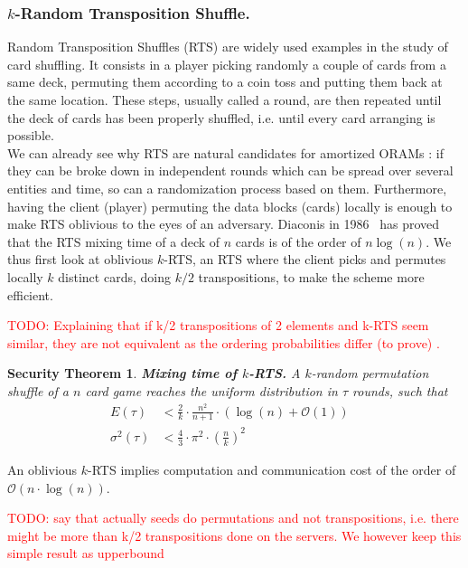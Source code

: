 \documentclass{llncs}
\newtheorem{secthm}{Security Theorem}
\newcommand{\todo}[1]{\textcolor{red}{TODO: #1}}
\begin{document}
\subsubsection{$k$-Random Transposition Shuffle.}
Random Transposition Shuffles (RTS) are widely used examples in the study of card shuffling. It consists in a player picking randomly a couple of cards from a same deck, permuting them according to a coin toss and putting them back at the same location.
These steps, usually called a round, are then repeated until the deck of cards has been properly shuffled, i.e. until every card arranging is possible.\\
We can already see why RTS are natural candidates for amortized ORAMs : if they can be broke down in independent rounds which can be spread over several entities and time, so can a randomization process based on them. Furthermore, having the client (player) permuting the data blocks (cards) locally is enough to make RTS oblivious to the eyes of an adversary.
Diaconis in 1986~\cite{aldous1986shuffling} has proved that the RTS mixing time of a deck of $n$ cards is of the order of $n\log(n)$. We thus first look at oblivious $k$-RTS, an RTS where the client picks and permutes locally $k$ distinct cards, doing $k/2$ transpositions, to make the scheme more efficient. 

\todo{Explaining that if k/2 transpositions of 2 elements and k-RTS seem similar, they are not equivalent as the ordering probabilities differ (to prove) .}

\begin{secthm}
\textbf{Mixing time of $k$-RTS.} A $k$-random permutation shuffle of a $n$ card game reaches the uniform distribution in $\tau$ rounds, such that
\begin{align*}
E(\tau) &< \frac{2}{k}\cdot\frac{n^2}{n+1}\cdot \left ( \log(n) + \mathcal{O}(1) \right ) &\\
\sigma^2(\tau) &< \frac{4}{3} \cdot {\pi}^2 \cdot \left ( \frac{n}{k} \right )^2 &
\end{align*}
\end{secthm}

An oblivious $k$-RTS implies computation and communication cost of the order of $\mathcal{O} \left(n\cdot \log(n)\right)$.

\todo{say that actually seeds do permutations and not transpositions, i.e. there might be more than k/2 transpositions done on the servers. We however keep this simple result as upperbound}
%
\end{document}
